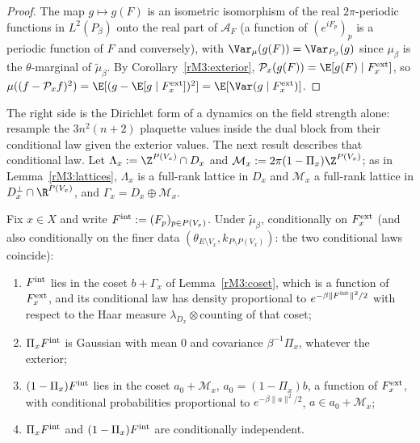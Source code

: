 \begin{proof}
The map $g\mapsto g(F)$ is an isometric isomorphism of the real
$2\pi$-periodic functions in $L^2(P_\beta)$ onto the real part of
$\mathcal A_F$ (a function of $(e^{iF_p})_p$ is a periodic function of
$F$ and conversely), with $\Var_\mu(g(F))=\Var_{P_\beta}(g)$ since
$\mu_\beta$ is the $\theta$-marginal of $\tilde\mu_\beta$. By
Corollary~\ref{rM3:exterior}, $\mathcal P_x(g(F))=\E[g(F)\mid F_x^{\rm
ext}]$, so $\mu((f-\mathcal P_xf)^2)=\E[(g-\E[g\mid F_x^{\rm ext}])^2]=
\E[\Var(g\mid F^{\rm ext}_x)]$.
\end{proof}

The right side is the Dirichlet form of a dynamics on the field strength
alone: resample the $3n^2(n+2)$ plaquette values inside the dual block
from their conditional law given the exterior values. The next result
describes that conditional law. Let $\Lambda_x:=\Z^{P(V_x)}\cap D_x$ and
$\mathcal M_x:=2\pi(1-\Pi_x)\Z^{P(V_x)}$; as in Lemma~\ref{rM3:lattices},
$\Lambda_x$ is a full-rank lattice in $D_x$ and $\mathcal M_x$ a full-rank
lattice in $D_x^\perp\cap\R^{P(V_x)}$, and $\Gamma_x=D_x\oplus\mathcal M_x$.

\begin{proposition}
\label{rM3:interior}
Fix $x\in X$ and write $F^{\rm int}:=(F_p)_{p\in P(V_x)}$. Under
$\tilde\mu_\beta$, conditionally on $F^{\rm ext}_x$ (and also
conditionally on the finer data $(\theta_{E\setminus V_x},k_{P\setminus
P(V_x)})$: the two conditional laws coincide):
\begin{enumerate}[label=\textup{(\roman*)},leftmargin=*]
\item $F^{\rm int}$ lies in the coset $b+\Gamma_x$ of
Lemma~\ref{rM3:coset}, which is a function of $F^{\rm ext}_x$, and its
conditional law has density proportional to $e^{-\beta\lVert F^{\rm int}
\rVert^2/2}$ with respect to the Haar measure $\lambda_{D_x}\otimes
\mathrm{counting}$ of that coset;
\item $\Pi_xF^{\rm int}$ is Gaussian with mean $0$ and covariance
$\beta^{-1}\Pi_x$, whatever the exterior;
\item $(1-\Pi_x)F^{\rm int}$ lies in the coset $a_0+\mathcal M_x$, $a_0=
(1-\Pi_x)b$, a function of $F^{\rm ext}_x$, with conditional probabilities
proportional to $e^{-\beta\lVert a\rVert^2/2}$, $a\in a_0+\mathcal M_x$;
\item $\Pi_xF^{\rm int}$ and $(1-\Pi_x)F^{\rm int}$ are conditionally
independent.
\end{enumerate}
\end{proposition}

